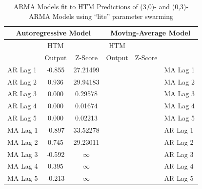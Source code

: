 \documentclass[oneside,12pt,openany]{book}
\begin{document}
    \begin{table}[hbt!]
        \centering
        \begin{tabular}{|l|c|c|c|c|l|}
            \hline
            \multicolumn{3}{|c|}{Autoregressive Model} & \multicolumn{3}{c|}{Moving-Average Model} \\ \hline
            \cellcolor{black} & HTM & & HTM &  & \cellcolor{black} \\
            \cellcolor{black} & Output & Z-Score & Output & Z-Score & \cellcolor{black} \\ \hline
            AR Lag 1 & -0.855 & 27.21499 &  &  & MA Lag 1 \\ \hline
            AR Lag 2 & 0.936 & 29.94183 &  &  & MA Lag 2 \\ \hline
            AR Lag 3 & 0.000 & 0.29578 &  &  & MA Lag 3 \\ \hline
            AR Lag 4 & 0.000 & 0.01674 &  &  & MA Lag 4 \\ \hline
            AR Lag 5 & 0.000 & 0.02213 &  &  & MA Lag 5 \\ \hline
            MA Lag 1 & -0.897 & 33.52278 &  &  & AR Lag 1 \\ \hline
            MA Lag 2 & 0.745 & 29.23011 &  &  & AR Lag 2 \\ \hline
            MA Lag 3 & -0.592 & $\infty$ &  &  & AR Lag 3 \\ \hline
            MA Lag 4 & 0.395 & $\infty$ &  &  & AR Lag 4 \\ \hline
            MA Lag 5 & -0.213 & $\infty$ &  &  & AR Lag 5 \\ \hline
        \end{tabular}
        \caption{ARMA Models fit to HTM Predictions of (3,0)- and (0,3)-ARMA Models using ``lite'' parameter swarming}
        \label{tab:HTMARMAError3Lite}
    \end{table}
		
\end{document}
